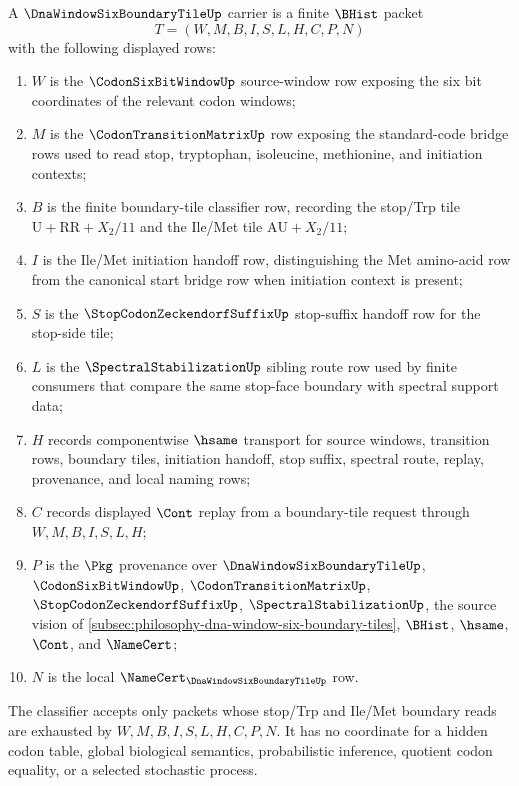 \begin{definition}
\label{def:dna-window-six-boundary-tile-carrier}
A $\DnaWindowSixBoundaryTileUp$ carrier is a finite $\BHist$ packet
$$
T=(W,M,B,I,S,L,H,C,P,N)
$$
with the following displayed rows:
\begin{enumerate}
\item $W$ is the $\CodonSixBitWindowUp$ source-window row exposing the six bit coordinates of the relevant codon windows;
\item $M$ is the $\CodonTransitionMatrixUp$ row exposing the standard-code bridge rows used to read stop, tryptophan, isoleucine, methionine, and initiation contexts;
\item $B$ is the finite boundary-tile classifier row, recording the stop/Trp tile $\mathrm{U}+\mathrm{RR}+X_2/11$ and the Ile/Met tile $\mathrm{AU}+X_2/11$;
\item $I$ is the Ile/Met initiation handoff row, distinguishing the Met amino-acid row from the canonical start bridge row when initiation context is present;
\item $S$ is the $\StopCodonZeckendorfSuffixUp$ stop-suffix handoff row for the stop-side tile;
\item $L$ is the $\SpectralStabilizationUp$ sibling route row used by finite consumers that compare the same stop-face boundary with spectral support data;
\item $H$ records componentwise $\hsame$ transport for source windows, transition rows, boundary tiles, initiation handoff, stop suffix, spectral route, replay, provenance, and local naming rows;
\item $C$ records displayed $\Cont$ replay from a boundary-tile request through $W,M,B,I,S,L,H$;
\item $P$ is the $\Pkg$ provenance over $\DnaWindowSixBoundaryTileUp$, $\CodonSixBitWindowUp$, $\CodonTransitionMatrixUp$, $\StopCodonZeckendorfSuffixUp$, $\SpectralStabilizationUp$, the source vision of \autoref{subsec:philosophy-dna-window-six-boundary-tiles}, $\BHist$, $\hsame$, $\Cont$, and $\NameCert$;
\item $N$ is the local $\NameCert_{\DnaWindowSixBoundaryTileUp}$ row.
\end{enumerate}
The classifier accepts only packets whose stop/Trp and Ile/Met boundary reads are exhausted by $W,M,B,I,S,L,H,C,P,N$. It has no coordinate for a hidden codon table, global biological semantics, probabilistic inference, quotient codon equality, or a selected stochastic process.
\end{definition}

